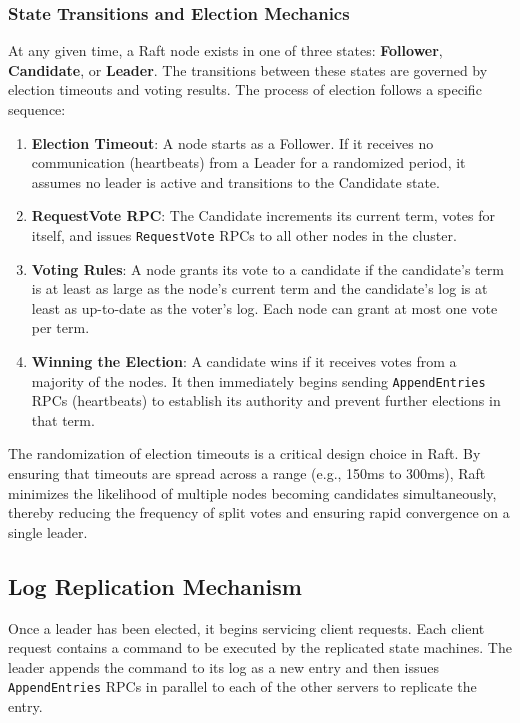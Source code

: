 \subsubsection{State Transitions and Election Mechanics}
At any given time, a Raft node exists in one of three states: \textbf{Follower}, \textbf{Candidate}, or \textbf{Leader}.
The transitions between these states are governed by election timeouts and voting results.
The process of election follows a specific sequence:
\begin{enumerate}
    \item \textbf{Election Timeout}: A node starts as a Follower. If it receives no communication (heartbeats) from a Leader for a randomized period, it assumes no leader is active and transitions to the Candidate state.
    \item \textbf{RequestVote RPC}: The Candidate increments its current term, votes for itself, and issues \texttt{RequestVote} RPCs to all other nodes in the cluster.
    \item \textbf{Voting Rules}: A node grants its vote to a candidate if the candidate's term is at least as large as the node's current term and the candidate's log is at least as up-to-date as the voter's log. Each node can grant at most one vote per term.
    \item \textbf{Winning the Election}: A candidate wins if it receives votes from a majority of the nodes. It then immediately begins sending \texttt{AppendEntries} RPCs (heartbeats) to establish its authority and prevent further elections in that term.
\end{enumerate}

The randomization of election timeouts is a critical design choice in Raft. By ensuring that timeouts are spread across a range (e.g., 150ms to 300ms), Raft minimizes the likelihood of multiple nodes becoming candidates simultaneously, thereby reducing the frequency of split votes and ensuring rapid convergence on a single leader.

\subsection{Log Replication Mechanism}
Once a leader has been elected, it begins servicing client requests. Each client request contains a command to be executed by the replicated state machines. The leader appends the command to its log as a new entry and then issues \texttt{AppendEntries} RPCs in parallel to each of the other servers to replicate the entry.

